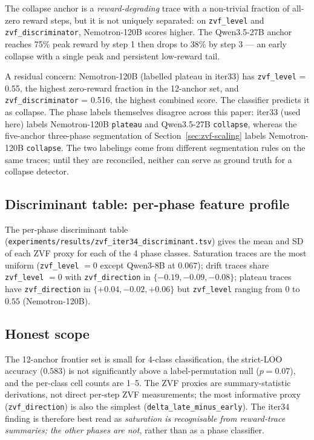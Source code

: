 The collapse anchor is a \emph{reward-degrading} trace with a non-trivial
fraction of all-zero reward steps, but it is not uniquely separated: on
\texttt{zvf\_level} and \texttt{zvf\_discriminator}, Nemotron-120B scores
higher. The Qwen3.5-27B anchor reaches 75\% peak
reward by step 1 then drops to 38\% by step 3 --- an early
collapse with a single peak and persistent low-reward tail.

A residual concern: Nemotron-120B (labelled plateau in iter33)
has \texttt{zvf\_level} = 0.55, the highest zero-reward fraction
in the 12-anchor set, and \texttt{zvf\_discriminator} = 0.516, the
highest combined score. The classifier predicts it as collapse.
The phase labels themselves disagree across this paper: iter33 (used here)
labels Nemotron-120B \texttt{plateau} and Qwen3.5-27B \texttt{collapse}, whereas the
five-anchor three-phase segmentation of Section~\ref{sec:zvf-scaling} labels
Nemotron-120B \texttt{collapse}. The two labelings come from different
segmentation rules on the same traces; until they are reconciled, neither
can serve as ground truth for a collapse detector.

\subsection{Discriminant table: per-phase feature profile}
\label{sec:zvf-iter34-discriminant}

The per-phase discriminant table
(\texttt{experiments/results/zvf\_iter34\_discriminant.tsv})
gives the mean and SD of each ZVF proxy for each of the 4 phase
classes. Saturation traces are the most uniform (\texttt{zvf\_level}
$=0$ except Qwen3-8B at $0.067$); drift traces share
\texttt{zvf\_level} $=0$ with \texttt{zvf\_direction} in
$\{-0.19, -0.09, -0.08\}$; plateau traces have \texttt{zvf\_direction} in
$\{+0.04, -0.02, +0.06\}$ but \texttt{zvf\_level} ranging from $0$ to $0.55$
(Nemotron-120B).

\subsection{Honest scope}
\label{sec:zvf-iter34-honest}

The 12-anchor frontier set is small for 4-class classification,
the strict-LOO accuracy ($0.583$) is not significantly above a label-permutation
null ($p=0.07$), and the per-class cell counts are 1--5. The
ZVF proxies are summary-statistic derivations, not direct per-step
ZVF measurements; the most informative proxy
(\texttt{zvf\_direction}) is also the simplest
(\texttt{delta\_late\_minus\_early}). The iter34 finding is
therefore best read as \emph{saturation is recognisable from reward-trace
summaries; the other phases are not}, rather than as a phase classifier.